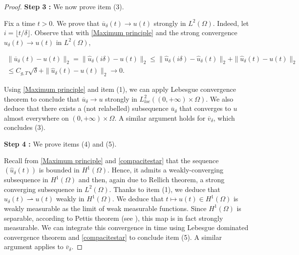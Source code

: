 \documentclass[reqno,12pt,twoside]{amsart}
\numberwithin{equation}{section} \numberwithin{theorem}{section}
\numberwithin{proposition}{section} \numberwithin{lemma}{section}
\numberwithin{corollary}{section}
\numberwithin{definition}{section} \numberwithin{remark}{section}
\begin{document}
\begin{proof}
\medskip

\textbf{Step 3 :} We now prove item (3).

\smallskip

Fix a time $t  >0$. We prove that $\overline{u}_\delta (t) \rightarrow u(t)$ strongly in $L^2(\Omega)$. Indeed, let $i= \lfloor t/ \delta \rfloor$. Observe that with \autoref{Maximum principle} and the strong convergence $\hat{u}_\delta(t) \rightarrow u(t)$ in $L^2(\Omega)$,

\begin{multline*}
\|\overline{u}_\delta (t) - u(t) \|_2 = \|\hat{u}_\delta (i\delta) - u(t)\|_2 \leqslant \|\hat{u}_\delta (i\delta) - \hat{u}_\delta (t)\|_2 + \|\hat{u}_\delta (t) -u(t)\|_2 \\
\leqslant C_{g,T}\sqrt{\delta} + \|\hat{u}_\delta (t) -u(t)\|_2 \rightarrow 0.
\end{multline*}

Using \autoref{Maximum principle} and item (1), we can apply Lebesgue convergence theorem to conclude that $\overline{u}_\delta \rightarrow u$ strongly in $L_{loc}^2((0,+\infty)\times \Omega)$. We also deduce that there exists a (not relabelled) subsequence $\overline{u}_\delta$ that converges to $u$ almost everywhere on $(0,+\infty)\times \Omega$. A similar argument holds for $\overline{v}_\delta$, which concludes (3). 

\medskip

\textbf{Step 4 :} We prove items (4) and (5).

\smallskip

Recall from \autoref{Maximum principle} and \eqref{compacitestar} that the sequence $(\hat{u}_\delta(t) )$ is bounded in $H^1(\Omega)$. Hence, it admits a weakly-converging subsequence in $H^1(\Omega)$ and then, again due to Rellich theorem, a strong converging subsequence in $L^2(\Omega)$. Thanks to item (1), we deduce that $\hat{u}_\delta(t) \rightharpoonup u(t)$ weakly in $H^1(\Omega)$. We deduce that $t\mapsto u(t) \in H^1(\Omega)$ is weakly measurable as the limit of weak measurable functions. Since $H^1(\Omega)$ is separable, according to Pettis theorem (see \cite[Theorem III.1.1]{S97}), this map is in fact strongly measurable. We can integrate this convergence in time using Lebesgue dominated convergence theorem and \eqref{compacitestar} to conclude item (5). A similar argument applies to $\overline{v}_\delta$. 


\end{proof}
\end{document}

